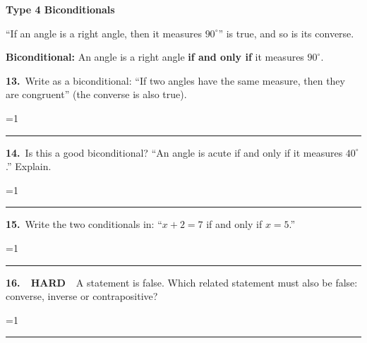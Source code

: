 \documentclass[11pt,letterpaper]{article}
\newcommand{\leveltag}[2]{\colorbox{#1}{\color{white}\bfseries\scriptsize\ #2\ }}
\newcommand{\LH}{\leveltag{fmmistake}{HARD}}
\newcommand{\topicbar}[1]{\needspace{4.5cm}\par\vspace{5mm}
  \begin{tcolorbox}[enhanced,colback=fmtitle,colframe=fmtitle,arc=2mm,left=4mm,top=1.5mm,bottom=1.5mm]
  \color{white}\bfseries\large #1
  \end{tcolorbox}}
\providecommand{\iskey}{0}
\newcommand{\pans}[2][3.2cm]{\ifnum\iskey=1 \underline{\makebox[#1][c]{\color{fmmistake}\bfseries #2}}\else\rule{#1}{0.4pt}\fi}
\newcommand{\algp}[3]{\begin{minipage}[t][4.6cm]{0.48\linewidth}{\color{fmturn}\bfseries #1.}\ #2\par\vfill\hfill \pans[4.2cm]{#3}\end{minipage}}
\newlength{\pw}
\renewcommand{\pans}[2][3.2cm]{\ifnum\iskey=1 \settowidth{\pw}{\bfseries #2}\ifdim\pw>#1 \parbox[b]{#1}{\raggedleft\color{fmmistake}\bfseries\small #2}\else\underline{\makebox[#1][c]{\color{fmmistake}\bfseries #2}}\fi\else\rule{#1}{0.4pt}\fi}
\begin{document}
\needspace{6cm}\topicbar{Type 4 \quad Biconditionals}
\begin{watchme}``If an angle is a right angle, then it measures $90^\circ$'' is true, and so is its converse.\par
\textbf{Biconditional:} An angle is a right angle \textbf{if and only if} it measures $90^\circ$.\end{watchme}
\needspace{4.6cm}\noindent\algp{13}{Write as a biconditional: ``If two angles have the same measure, then they are congruent'' (the converse is also true).}{Two angles are congruent if and only if they have the same measure.}\hfill\algp{14}{Is this a good biconditional? ``An angle is acute if and only if it measures $40^\circ$.'' Explain.}{No: a $60^\circ$ angle is acute but is not $40^\circ$.}\par\vspace{2mm}
\needspace{4.6cm}\noindent\algp{15}{Write the two conditionals in: ``$x + 2 = 7$ if and only if $x = 5$.''}{If $x + 2 = 7$, then $x = 5$; if $x = 5$, then $x + 2 = 7$.}\hfill\algp{16}{\LH\ A statement is false. Which related statement must also be false: converse, inverse or contrapositive?}{the contrapositive}\par
\end{document}
